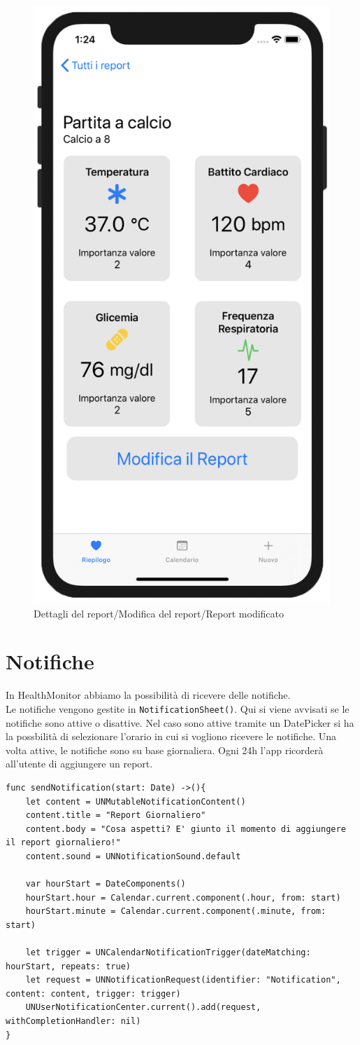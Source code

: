 \documentclass{article}
\begin{document}
\begin{figure}[htp]
\includegraphics[width=.32\textwidth]{img/ReportView1.png}

\caption{Dettagli del report/Modifica del report/Report modificato}
\label{fig:figure5}

\end{figure}



\newpage
\section{Notifiche}

In HealthMonitor abbiamo la possibilità di ricevere delle notifiche.\\
Le notifiche vengono gestite in \texttt{NotificationSheet()}. Qui si viene avvisati se le notifiche sono attive o disattive. Nel caso sono attive tramite un DatePicker si ha la possbilità di selezionare l'orario in cui si vogliono ricevere le notifiche. Una volta attive, le notifiche sono su base giornaliera. Ogni 24h l'app ricorderà all'utente di aggiungere un report. 

\begin{lstlisting}
func sendNotification(start: Date) ->(){
	let content = UNMutableNotificationContent()
	content.title = "Report Giornaliero"
	content.body = "Cosa aspetti? E' giunto il momento di aggiungere il report giornaliero!"
	content.sound = UNNotificationSound.default
        
	var hourStart = DateComponents()
	hourStart.hour = Calendar.current.component(.hour, from: start)
	hourStart.minute = Calendar.current.component(.minute, from: start)
        
	let trigger = UNCalendarNotificationTrigger(dateMatching: hourStart, repeats: true)
	let request = UNNotificationRequest(identifier: "Notification", content: content, trigger: trigger)
	UNUserNotificationCenter.current().add(request, withCompletionHandler: nil)
}    
\end{lstlisting}
\end{document}
